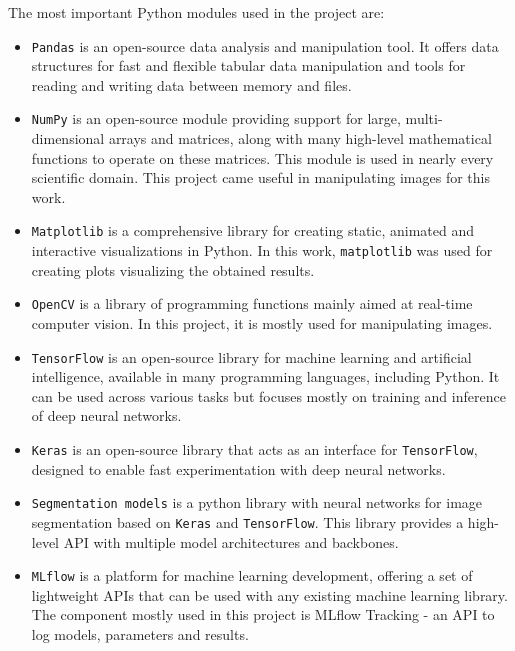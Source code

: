\documentclass[a4paper,twoside,12pt]{book}
\begin{document}
The most important Python modules used in the project are:
\begin{itemize}
    \item \texttt{Pandas} is an open-source data analysis and manipulation tool. It offers data structures for fast and flexible tabular data manipulation and tools for reading and writing data between memory and files.

    \item \texttt{NumPy} is an open-source module providing support for large, multi-dimensional arrays and matrices, along with many high-level mathematical functions to operate on these matrices. This module is used in nearly every scientific domain. This project came useful in manipulating images for this work.

    \item \texttt{Matplotlib} is a comprehensive library for creating static, animated and interactive visualizations in Python. In this work, \texttt{matplotlib} was used for creating plots visualizing the obtained results.

    \item \texttt{OpenCV} is a library of programming functions mainly aimed at real-time computer vision. In this project, it is mostly used for manipulating images.

    \item \texttt{TensorFlow} is an open-source library for machine learning and artificial intelligence, available in many programming languages, including Python. It can be used across various tasks but focuses mostly on training and inference of deep neural networks.

    \item \texttt{Keras} is an open-source library that acts as an interface for \texttt{TensorFlow}, designed to enable fast experimentation with deep neural networks.

    \item \texttt{Segmentation models} is a python library with neural networks for image segmentation based on \texttt{Keras} and \texttt{TensorFlow}. This library provides a high-level API with multiple model architectures and backbones.

    \item \texttt{MLflow} is a platform for machine learning development, offering a set of lightweight APIs that can be used with any existing machine learning library. The component mostly used in this project is MLflow Tracking - an API to log models, parameters and results.
\end{itemize}
\end{document}
